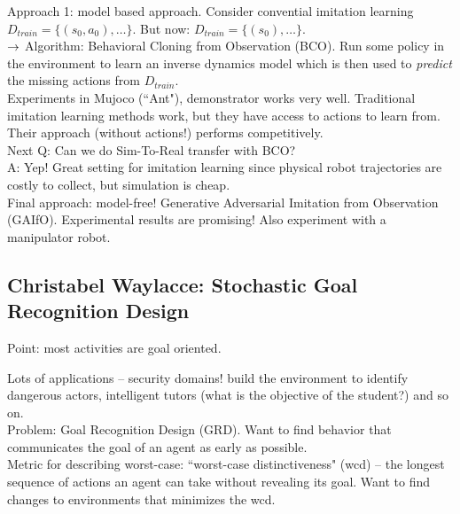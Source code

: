 Approach 1: model based approach. Consider convential imitation learning $D_{train} = \{(s_0, a_0), \ldots\}$. But now: $D_{train} = \{(s_0), \ldots\}$. \\


$\rightarrow$ Algorithm: Behavioral Cloning from Observation (BCO). Run some policy in the environment to learn an inverse dynamics model which is then used to {\it predict} the missing actions from $D_{train}$. \\

Experiments in Mujoco (``Ant"), demonstrator works very well. Traditional imitation learning methods work, but they have access to actions to learn from. Their approach (without actions!) performs competitively. \\

Next Q: Can we do Sim-To-Real transfer with BCO? \\

A: Yep! Great setting for imitation learning since physical robot trajectories are costly to collect, but simulation is cheap. \\


Final approach: model-free! Generative Adversarial Imitation from Observation (GAIfO). Experimental results are promising! Also experiment with a manipulator robot. \\

\spacerule
\subsection{Christabel Waylacce: Stochastic Goal Recognition  Design}

Point: most activities are goal oriented. \\


Lots of applications -- security domains! build the environment to identify dangerous actors, intelligent tutors (what is the objective of the student?) and so on. \\

Problem: Goal Recognition Design (GRD). Want to find behavior that communicates the goal of an agent as early as possible. \\

Metric for describing worst-case: ``worst-case distinctiveness" (wcd) -- the longest sequence of actions an agent can take without revealing its goal. Want to find changes to environments that minimizes the wcd. \\

